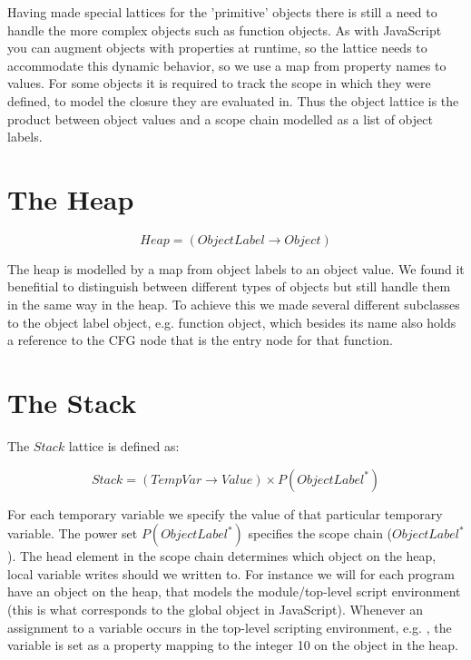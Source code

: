 Having made special lattices for the 'primitive' objects there is still a need to handle the more complex objects such as function objects. As with JavaScript you can augment objects with properties at runtime, so the lattice needs to accommodate this dynamic behavior, so we use a map from property names to values. For some objects it is required to track the scope in which they were defined, to model the closure they are evaluated in. Thus the object lattice is the product between object values and a scope chain modelled as a list of object labels.


\section{The Heap}
\begin{equation*}
Heap = (ObjectLabel \rightarrow Object)
\end{equation*}

The heap is modelled by a map from object labels to an object value. We found it benefitial to distinguish between different types of objects but still handle them in the same way in the heap. To achieve this we made several different subclasses to the object label object, e.g. function object, which besides its name also holds a reference to the CFG node that is the entry node for that function.


\section{The Stack}
The $Stack$ lattice is defined as:

\begin{equation*}
Stack = (TempVar \rightarrow Value) \times P(ObjectLabel^{*})
\end{equation*}

For each temporary variable we specify the value of that particular temporary variable. The power set $P(ObjectLabel^{*})$ specifies the scope chain ($ObjectLabel^{*}$). The head element in the scope chain determines which object on the heap, local variable writes should we written to. For instance we will for each program have an object on the heap, that models the module/top-level script environment \cite{pyref.main} (this is what corresponds to the global object in JavaScript). Whenever an assignment to a variable occurs in the top-level scripting environment, e.g. , the variable  is set as a property mapping to the integer 10 on the  object in the heap.

